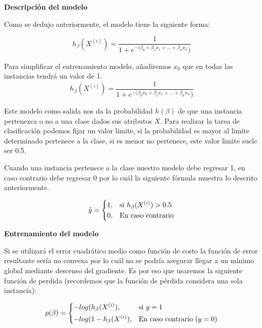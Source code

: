 \documentclass[11pt,fleqn]{book} %
\begin{document}
\textbf{Descripción del modelo}

Como se dedujo anteriormente, el modelo tiene la siguiente forma:

\begin{equation}
h_\beta(X^{(i)}) = \frac{1}{1+e^{-(\beta_0 + \beta_1 x_1 + ... + \beta_n x_n})} 
\label{eqn:suposicion_inicial_final2} 
\end{equation}

Para simplificar el entrenamiento modelo, añadiremos $x_0$ que en todas las instancias tendrá un valor de 1.
\begin{equation}
h_\beta(X^{(i)}) = \frac{1}{1+e^{-(\beta_0 x_0 + \beta_1 x_1 + ... + \beta_n x_n})} 
\label{eqn:suposicion_inicial_final3} 
\end{equation}

Este modelo como salida nos da la probabilidad $h(\beta)$ de que una instancia pertenezca o no a una clase dados sus atributos $X$. Para realizar la tarea de clasificación podemos fijar un valor limite, si la probabilidad es mayor al limite determinado pertenece a la clase, si es menor no pertenece, este valor limite suele ser 0.5.

Cuando una instancia pertenece a la clase nuestro modelo debe regresar 1, en caso contrario debe regresar 0 por lo cuál la siguiente fórmula muestra lo descrito anteriormente.

\begin{equation}
\label{eqn:prob_reg_logistica}
    \hat{y} = 
\begin{dcases}
    1,& \text{si } h_\beta(X^{(i)}) > 0.5 \\
    0,& \text{En caso contrario}
\end{dcases} 
\end{equation}

\textbf{Entrenamiento del modelo}

Si se utilizará el error cuadrático medio como función de costo la función de error resultante sería no convexa por lo cuál no se podría asegurar llegar a un mínimo global mediante descenso del gradiente. Es por eso que usaremos la siguiente función de perdida (recordemos que la función de pérdida considera una sola instancia):

\begin{equation}
    p( \beta ) = 
\begin{dcases}
    -log(h_\beta(X^{(i)}),& \text{si } y = 1\\
    -log(1-h_\beta(X^{(i)}),& \text{En caso contrario } (y=0)
\end{dcases} 
\label{eqn:costo_reg_logistica} 
\end{equation}
\end{document}
